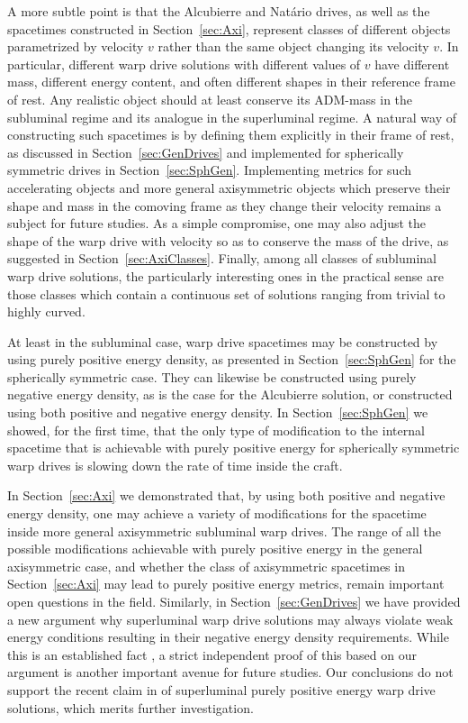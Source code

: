 \documentclass[10pt]{iopart}
\begin{document}
A more subtle point is that the Alcubierre and Natário drives, as well as the spacetimes constructed in Section~\ref{sec:Axi}, represent classes of different objects parametrized by velocity $v$ rather than the same object changing its velocity $v$. In particular, different warp drive solutions with different values of $v$ have different mass, different energy content, and often different shapes in their reference frame of rest. Any realistic object should at least conserve its ADM-mass in the subluminal regime and its analogue in the superluminal regime. A natural way of constructing such spacetimes is by defining them explicitly in their frame of rest, as discussed in Section~\ref{sec:GenDrives} and implemented for spherically symmetric drives in Section~\ref{sec:SphGen}. Implementing metrics for such accelerating objects and more general axisymmetric objects which preserve their shape and mass in the comoving frame as they change their velocity remains a subject for future studies. As a simple compromise, one may also adjust the shape of the warp drive with velocity so as to conserve the mass of the drive, as suggested in Section~\ref{sec:AxiClasses}. Finally, among all classes of subluminal warp drive solutions, the particularly interesting ones in the practical sense are those classes which contain a continuous set of solutions ranging from trivial to highly curved.

At least in the subluminal case, warp drive spacetimes may be constructed by using purely positive energy density, as presented in Section~\ref{sec:SphGen} for the spherically symmetric case. They can likewise be constructed using purely negative energy density, as is the case for the Alcubierre solution, or constructed using both positive and negative energy density. In Section~\ref{sec:SphGen} we showed, for the first time, that the only type of modification to the internal spacetime that is achievable with purely positive energy for spherically symmetric warp drives is slowing down the rate of time inside the craft.

In Section~\ref{sec:Axi} we demonstrated that, by using both positive and negative energy density, one may achieve a variety of modifications for the spacetime inside more general axisymmetric subluminal warp drives. The range of all the possible modifications achievable with purely positive energy in the general axisymmetric case, and whether the class of axisymmetric spacetimes in Section~\ref{sec:Axi} may lead to purely positive energy metrics, remain important open questions in the field.  Similarly, in Section~\ref{sec:GenDrives} we have provided a new argument why superluminal warp drive solutions may always violate weak energy conditions resulting in their negative energy density requirements. While this is an established fact \cite{Olum1998,Visser2000}, a strict independent proof of this based on our argument is another important avenue for future studies. Our conclusions do not support the recent claim in \cite{Lentz2020} of superluminal purely positive energy warp drive solutions, which merits further investigation.
\end{document}
